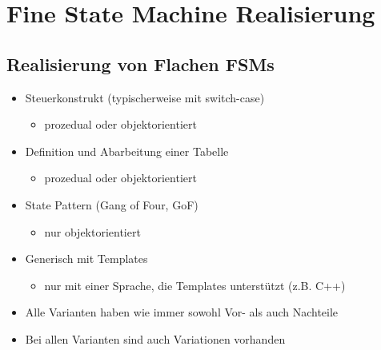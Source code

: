 \section{Fine State Machine Realisierung}

\subsection{Realisierung von Flachen FSMs}
\begin{itemize}
  \item Steuerkonstrukt (typischerweise mit switch-case)
  \begin{itemize}
    \item prozedual oder objektorientiert
   \end{itemize}
   \item Definition und Abarbeitung einer Tabelle
  \begin{itemize}
    \item prozedual oder objektorientiert
   \end{itemize}
   \item State Pattern (Gang of Four, GoF)
  \begin{itemize}
    \item nur objektorientiert
   \end{itemize}
   \item Generisch mit Templates
  \begin{itemize}
    \item nur mit einer Sprache, die Templates unterstützt (z.B. C++)
   \end{itemize}
   \item Alle Varianten haben wie immer sowohl Vor- als auch Nachteile
   \item Bei allen Varianten sind auch Variationen vorhanden
\end{itemize}

